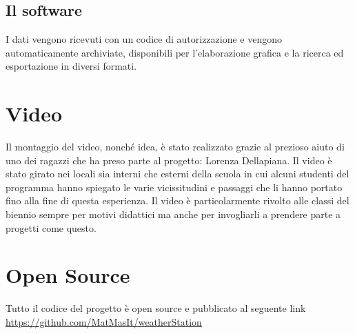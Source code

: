 \documentclass{article}
\begin{document}
\subsection{Il software}
I dati vengono ricevuti con un codice di autorizzazione e vengono automaticamente archiviate, disponibili per l'elaborazione grafica e la ricerca ed esportazione in diversi formati.
\section{Video}

Il montaggio del video, nonché idea,  è stato realizzato grazie al prezioso aiuto di uno dei ragazzi che ha preso parte al progetto: Lorenza Dellapiana.
Il video è stato girato nei locali sia interni che esterni della scuola in cui alcuni studenti del programma hanno spiegato le varie vicissitudini e passaggi che li hanno portato fino alla fine di questa esperienza. Il video è particolarmente rivolto alle classi del biennio sempre per motivi didattici ma anche per invogliarli a prendere parte a progetti come questo.

\section{Open Source}
Tutto il codice del progetto è open source e pubblicato al seguente link\\
\url{https://github.com/MatMasIt/weatherStation}
\end{document}
